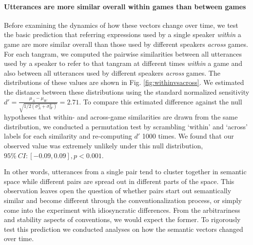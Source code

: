 \documentclass[alpha-refs]{wiley-article}
\begin{document}
\paragraph{Utterances are more similar overall within games than between games}  
Before examining the dynamics of how these vectors change over time, we test the basic prediction that referring expressions used by a single speaker \emph{within} a game are more similar overall than those used by different speakers \emph{across} games.
For each tangram, we computed the pairwise similarities between all utterances used by a speaker to refer to that tangram at different times \emph{within} a game and also between all utterances used by different speakers \emph{across} games. 
The distributions of these values are shown in Fig. \ref{fig:withinvsacross}.
We estimated the distance between these distributions using the standard normalized sensitivity $d' = \frac{\mu_A - \mu_W}{\sqrt{1/2(\sigma^2_A+\sigma^2_W)}} = 2.71$.
To compare this estimated difference against the null hypotheses that within- and across-game similarities are drawn from the same distribution, we conducted a permutation test by scrambling `within' and `across' labels for each similarity and re-computing $d'$ 1000 times. 
We found that our observed value was extremely unlikely under this null distribution, $95\%~CI: [-0.09, 0.09], p < 0.001$. 

In other words, utterances from a single pair tend to cluster together in semantic space while different pairs are spread out in different parts of the space.
This observation leaves open the question of whether pairs start out semantically similar and become different through the conventionalization process, or simply come into the experiment with idiosyncratic differences.
From the arbitrariness and stability aspects of conventions, we would expect the former.
To rigorously test this prediction we conducted analyses on how the semantic vectors changed over time.
\end{document}
